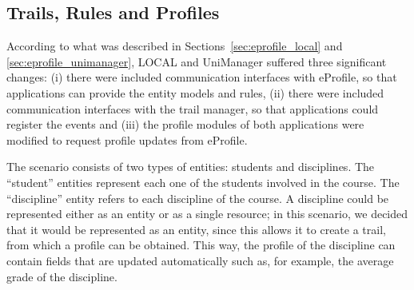 \documentclass[preprint,authoryear,12pt,dvipdfm]{elsarticle}
\begin{document}


\subsection{Trails, Rules and Profiles}
\label{sec:trilhas_cen1}

According to what was described in Sections~\ref{sec:eprofile_local} and \ref{sec:eprofile_unimanager}, LOCAL and UniManager suffered three significant changes: (i) there were included communication interfaces with eProfile, so that applications can provide the entity models and rules, (ii) there were included  communication interfaces with the trail manager, so that applications could register the events and (iii) the profile modules of both applications were modified to request profile updates from eProfile.

The scenario consists of two types of entities: students and disciplines. The ``student'' entities represent each one of the students involved in the course. The ``discipline'' entity refers to each discipline of the course. A discipline could be represented either as an entity or as a single resource; in this scenario, we decided that it would be represented as an entity, since this  allows it to create a trail, from which a profile can be obtained. This way, the profile of the discipline can contain fields that are updated automatically such as, for example, the average grade of the discipline.


\end{document}
